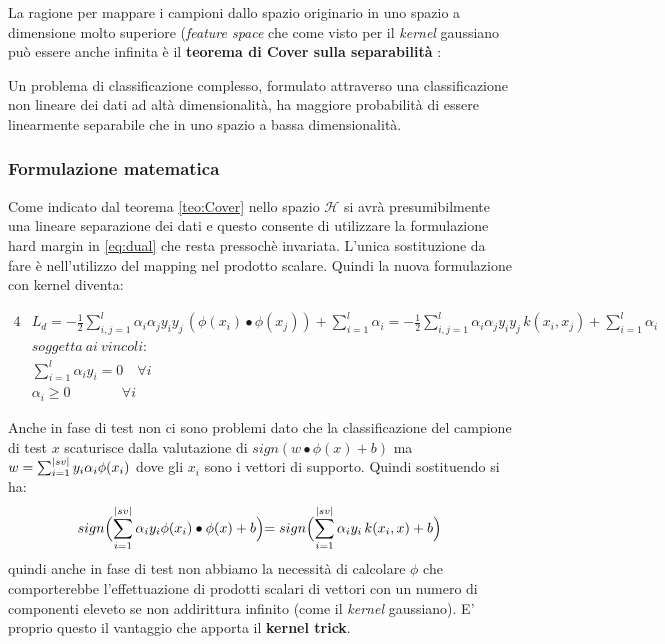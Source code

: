 La ragione per mappare i campioni dallo spazio originario in uno spazio a dimensione molto superiore (\textit{feature space} che come visto per il \textit{kernel} gaussiano può essere anche infinita è il \textbf{teorema di Cover sulla separabilità} \cite{Cover65}:
\begin{teorema}
\label{teo:Cover}
Un problema di classificazione complesso, formulato attraverso una classificazione non lineare dei dati ad altà dimensionalità, ha maggiore probabilità di essere linearmente separabile che in uno spazio a bassa dimensionalità.
\end{teorema}

\subsubsection{Formulazione matematica}
Come indicato dal teorema \ref{teo:Cover} nello spazio $\mathcal{H}$ si avrà presumibilmente una lineare separazione dei dati e questo consente di utilizzare la formulazione hard margin in \eqref{eq:dual}  che resta pressochè invariata. L'unica sostituzione da fare è nell'utilizzo del mapping nel prodotto scalare. Quindi la nuova formulazione  con kernel diventa:

\begin{alignat}{4}
& L_{d} = - \frac{1}{2} \sum_{i,j = 1}^{l}\alpha_{i}\alpha_{j}y_{i}y_{j}\,(\phi(x_{i}) \bullet \phi(x_{j})) + \sum_{i=1}^{l}\alpha_{i} = - \frac{1}{2} \sum_{i,j = 1}^{l}\alpha_{i}\alpha_{j}y_{i}y_{j}\,k(x_{i} ,  x_{j}) + \sum_{i=1}^{l}\alpha_{i} \label{eq:Kerdual}\\
& soggetta \:ai\:vincoli: \nonumber\\
&\sum_{i=1}^{l}\alpha_{i}y_{i} = 0 \quad \forall i \nonumber\\
&\alpha_{i} \geq 0 \qquad \quad\:\:\: \forall i \nonumber
\end{alignat}

Anche in fase di test non ci sono problemi dato che  la classificazione del campione di test $x$ scaturisce dalla valutazione di $sign(w \bullet \phi(x) +b)$ ma $w = \sum_{i =1}^{\lvert sv\rvert}y_i\alpha_i\phi(x_i)$ dove gli $x_i$ sono i vettori di supporto. Quindi sostituendo si ha:
\begin{equation}
sign\Bigl(\sum_{i=1}^{\lvert sv\rvert}\alpha_iy_i\phi(x_i) \bullet \phi(x) + b \Bigl)= sign\Bigl(\sum_{i=1}^{\lvert sv\rvert}\alpha_iy_i\,k(x_i , x) + b\Bigl)
\end{equation}
quindi anche in fase di test non abbiamo la necessità di calcolare $\phi$ che comporterebbe l'effettuazione di prodotti scalari di vettori con un numero di componenti eleveto se non addirittura infinito (come il \textit{kernel} gaussiano). E' proprio questo il vantaggio che apporta il \textbf{kernel trick}.

